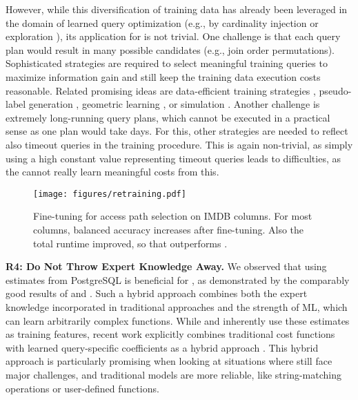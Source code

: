 However, while this diversification of training data has already been leveraged in the domain of learned query optimization (e.g., by cardinality injection \cite{zhu2023, doshi23} or exploration \cite{yang_balsa_2022}), its application for \lcms is not trivial.
One challenge is that each query plan would result in many possible candidates (e.g., join order permutations).
Sophisticated strategies are required to select meaningful training queries to maximize information gain and still keep the training data execution costs reasonable.
Related promising ideas are data-efficient training strategies \cite{agnihotri2024}, pseudo-label generation \cite{liu2022}, geometric learning \cite{reiner2023}, or simulation \cite{yang_balsa_2022}.
Another challenge is extremely long-running query plans, which cannot be executed in a practical sense as one plan would take days.
For this, other strategies are needed to reflect also timeout queries in the training procedure.
This is again non-trivial, as simply using a high constant value representing timeout queries leads to difficulties, as the \lcm cannot really learn meaningful costs from this.

\begin{figure}
    \centering
    \texttt{[image: figures/retraining.pdf]}
    \caption{Fine-tuning for access path selection on IMDB columns. 
     For most columns, balanced accuracy increases after fine-tuning.
     Also the total runtime improved, so that \zeroshot outperforms \postgres.}
    \label{fig:retraining}
\end{figure}

\noindent \textbf{R4: Do Not Throw Expert Knowledge Away.}
We observed that using estimates from PostgreSQL is beneficial for \lcms, as demonstrated by the comparably good results of \dace and \qppnet.
Such a hybrid approach combines both the expert knowledge incorporated in traditional approaches and the strength of ML, which can learn arbitrarily complex functions.
While \dace and \qppnet inherently use these estimates as training features, recent work explicitly combines traditional cost functions with learned query-specific coefficients as a hybrid approach \cite{yang2023}.
This hybrid approach is particularly promising when looking at situations where \lcms still face major challenges, and traditional models are more reliable, like string-matching operations or user-defined functions.